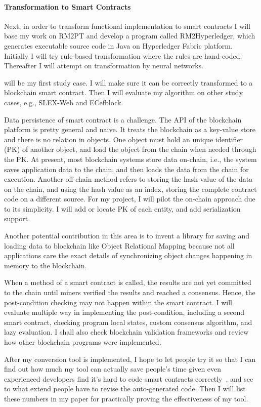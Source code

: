 \paragraph*{Transformation to Smart Contracts}
Next, in order to transform functional implementation to smart contracts
I will base my work on RM2PT and develop a program called RM2Hyperledger, which generates executable source code in Java on Hyperledger Fabric platform.
Initially I will try rule-based transformation where the rules are hand-coded. Thereafter I will attempt on transformation by neural networks.

{\cocome} will be my first study case. I will make sure it can be correctly transformed to a blockchain smart contract. Then I will evaluate my algorithm on other study cases, e.g., SLEX-Web and ECefblock.


Data persistence of smart contract is a challenge.
The API of the blockchain platform is pretty general and naive. It treats the blockchain as a key-value store and there is no relation in objects. One object must hold an unique identifier (PK) of another object, and load the object from the chain when needed through the PK.
At present, most blockchain systems store data on-chain, i.e., the system saves application data to the chain, and then loads the data from the chain for execution.
Another off-chain method refers to storing the hash value of the data on the chain, and using the hash value as an index, storing the complete contract code on a different source.
For my project, I will pilot the on-chain approach due to its simplicity. I will add or locate PK of each entity, and add serialization support.

Another potential contribution in this area is to invent a library for saving and loading data to blockchain like Object Relational Mapping because
not all applications care the exact details of synchronizing object changes happening in memory to the blockchain.

When a method of a smart contract is called, the results are not yet committed to the chain until miners verified the results and reached a consensus. Hence, the post-condition checking may not happen within the smart contract. I will evaluate multiple way in implementing the post-condition, including a second smart contract, checking program local states, custom consensus algorithm, and lazy evaluation.
I shall also check blockchain validation frameworks and review how other blockchain programs were implemented.

After my conversion tool is implemented, I hope to let people try it so that I can find out how much my tool can actually save people's time given even experienced developers find it's hard to code smart contracts correctly~\cite{dao2019challenges}, and see to what extend people have to revise the auto-generated code. Then I will list these numbers in my paper for practically proving the effectiveness of my tool.



